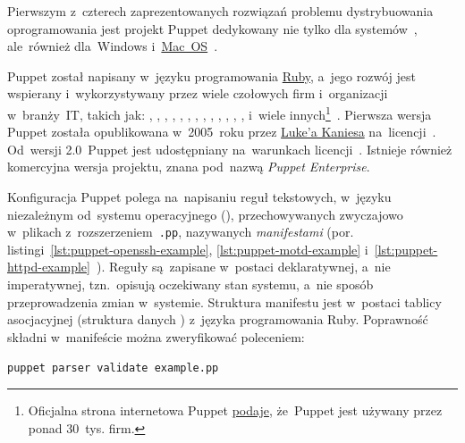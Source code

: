 \documentclass[thesis]{subfiles}
\begin{document}
Pierwszym z~czterech zaprezentowanych rozwiązań problemu dystrybuowania oprogramowania jest projekt Puppet dedykowany nie tylko dla systemów~, ale~również dla~Windows i~\href{https://en.wikipedia.org/wiki/MacOS}{Mac~OS}~\cite{puppet,puppet-github}.

Puppet został napisany w~języku programowania \href{https://en.wikipedia.org/wiki/Ruby_(programming_language)}{Ruby}, a~jego rozwój jest wspierany i~wykorzystywany przez wiele czołowych firm i~organizacji w~branży~IT, takich jak: \emph{\google{}}, \emph{\nasa{}}, \emph{\intel{}}, , , , \emph{\twitter{}}, \emph{\uber{}}, , \emph{\cern{}}, \emph{\stanford{}}, \emph{\wikipedia{}}, \emph{\paypal{}}, \emph{\dell{}} i~wiele innych\footnote{Oficjalna strona internetowa Puppet \href{https://puppet.com/company/leadership/luke-kanies}{podaje}, że~Puppet jest używany przez ponad 30~tys. firm.}~\cite{puppet,puppet-google,puppet-cern,puppet-chef-disney}. Pierwsza wersja Puppet została opublikowana w~2005~roku przez \href{https://puppet.com/company/leadership/luke-kanies}{Luke'a Kaniesa} na~licencji~. Od~wersji 2.0~Puppet jest udostępniany na~warunkach licencji~. Istnieje również komercyjna wersja projektu, znana pod~nazwą \emph{Puppet Enterprise}.

Konfiguracja Puppet polega na~napisaniu reguł tekstowych, w~języku niezależnym od~systemu operacyjnego (), przechowywanych zwyczajowo w~plikach z~rozszerzeniem~\texttt{.pp}, nazywanych \emph{manifestami} (por. listingi~\ref{lst:puppet-openssh-example}, \ref{lst:puppet-motd-example} i~\ref{lst:puppet-httpd-example}~\cite{puppet-examples}). Reguły są~zapisane w~postaci deklaratywnej, a~nie imperatywnej, tzn.~opisują oczekiwany stan systemu, a~nie sposób przeprowadzenia zmian w~systemie. Struktura manifestu jest w~postaci tablicy asocjacyjnej (struktura danych ) z~języka programowania Ruby. Poprawność składni w~manifeście  można zweryfikować poleceniem:\mynobreakpar
\begin{center}
	\texttt{puppet parser validate example.pp}
\end{center}
\end{document}
